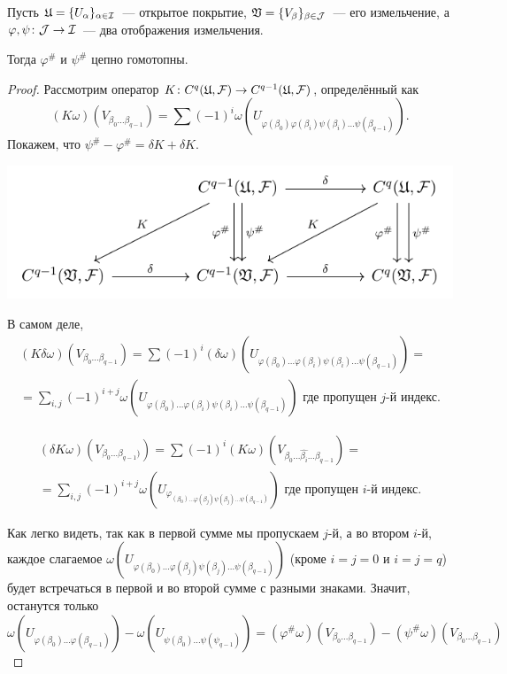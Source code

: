 	\begin{lemma} 
		Пусть $\mathfrak{U} = \{ U_{\alpha} \}_{\alpha \in \mathcal{I}}$~--- открытое покрытие, $\mathfrak{V} = \{ V_{\beta} \}_{\beta \in \mathcal{J}}$~--- его измельчение, а $\varphi, \psi \colon \mathcal{J} \to \mathcal{I}$~--- два отображения измельчения. 

		Тогда  $\varphi^{\#}$ и $\psi^{\#}$ цепно гомотопны.
	\end{lemma}
	\begin{proof}
		Рассмотрим оператор $K\colon C^{q}(\mathfrak{U}, \mathcal{F}) \to C^{q - 1}(\mathfrak{U}, \mathcal{F})$, определённый как 
		\[
			(K\omega)(V_{\beta_0 \ldots \beta_{q - 1}}) = \sum (-1)^i \omega(U_{\varphi(\beta_0) \varphi(\beta_i) \psi(\beta_i) \ldots \psi(\beta_{q - 1})}). 
		\]
		Покажем, что  $\psi^{\#} - \varphi^{\#} = \delta K + \delta K$. 
		\begin{center}
			\includegraphics{lectures/7/pictures/cd_42.pdf}
		\end{center}

		В самом деле, 
		\begin{multline*}
			(K\delta \omega)(V_{\beta_0 \ldots \beta_{q - 1}}) = \sum (-1)^i (\delta \omega)(U_{\varphi(\beta_0) \ldots \varphi(\beta_i) \psi(\beta_i) \ldots \psi(\beta_{q - 1})}) = \\ = \sum_{i, j} (-1)^{i + j} \omega(U_{\varphi(\beta_0) \ldots \varphi(\beta_i) \psi(\beta_i) \ldots \psi(\beta_{q - 1})}) \text{ где пропущен } j \text{-й индекс}.
		\end{multline*}

		\begin{multline*}
			(\delta K \omega)(V_{\beta_0 \ldots \beta_{q - 1})}) = \sum (-1)^i (K \omega)(V_{\beta_{0} \ldots \widehat{\beta_i} \ldots \beta_{q  - 1}}) = \\ = \sum_{i, j} (-1)^{i + j} \omega(U_{\varphi_{(\beta_0) \ldots \varphi(\beta_j) \psi(\beta_j) \ldots \psi(\beta_{q - 1})}}) \text{ где пропущен } i \text{-й индекс}.
		\end{multline*}

		Как легко видеть, так как в первой сумме мы пропускаем $j$-й, а во втором $i$-й, каждое слагаемое $\omega(U_{\varphi(\beta_0) \ldots \varphi(\beta_j) \psi(\beta_j) \ldots \psi(\beta_{q - 1})})$ (кроме $i = j = 0$ и $i = j = q$) будет встречаться в первой и во второй сумме с разными знаками. Значит, останутся только 
		\[
			\omega(U_{\varphi(\beta_0) \ldots \varphi(\beta_{q - 1})}) - \omega(U_{\psi(\beta_0) \ldots \psi(\psi_{q - 1} ) }) = (\varphi^{\#}\omega)(V_{\beta_{0} \ldots \beta_{q - 1}}) - (\psi^{\#}\omega)(V_{\beta_{0} \ldots \beta_{q - 1} })
		\]

	\end{proof}

